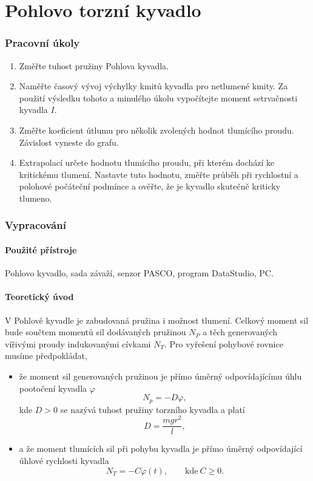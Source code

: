 \documentclass[english]{article}
\newcommand{\unit}[1]{\mathrm{#1}}
\begin{document}
\part{Pohlovo torzní kyvadlo}

\section{Pracovní úkoly}
	\begin{enumerate}
	\item Změřte tuhost pružiny Pohlova kyvadla.
	\item Naměřte časový vývoj výchylky kmitů kyvadla pro netlumené kmity. Za použití výsledku tohoto a minulého úkolu vypočítejte moment setrvačnosti kyvadla $I$.
	\item Změřte koeficient útlumu pro několik zvolených hodnot tlumícího proudu. Závislost vyneste do grafu.
	\item Extrapolací určete hodnotu tlumícího proudu, při kterém dochází ke kritickému tlumení. Nastavte tuto hodnotu, změřte průběh při rychlostní a polohové počáteční podmínce a ověřte, že je kyvadlo skutečně kriticky tlumeno.
	\end{enumerate}

\section{Vypracování}

\subsection{Použité přístroje}
	Pohlovo kyvadlo, sada závaží, senzor PASCO, program DataStudio, PC.

\subsection{Teoretický úvod}
	V Pohlově kyvadle je zabudovaná pružina	i možnost tlumení. Celkový moment sil bude součtem momentů sil dodávaných pružinou $N_P$ a těch generovaných vířivými proudy indukovanými cívkami $N_T$. Pro vyřešení pohybové rovnice musíme předpokládat, 
	
	\begin{itemize}
		\item že moment sil generovaných pružinou je přímo úměrný odpovídajícímu úhlu pootočení kyvadla $\varphi$ 
		\begin{equation}
		N_p = -D\varphi,
		\end{equation}
		kde $D > 0$ se nazývá tuhost pružiny torzního kyvadla a platí 
		\begin{equation}
		D = \frac{mgr^2}{l},
		\label{eq:pohl_D}
		\end{equation}
				
		\item a že moment tlumících sil při pohybu kyvadla je přímo úměrný odpovídající úhlové rychlosti kyvadla
		\begin{equation}
		N_T = -C \dot{\varphi}(t), \qquad \unit{kde\ } C \ge 0.
		\end{equation}
		
	\end{itemize}
	
\end{document}
